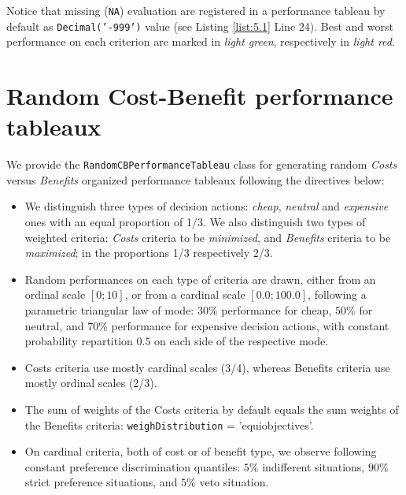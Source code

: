 Notice that missing (\texttt{NA}) evaluation are registered in a performance tableau by default as \texttt{Decimal('-999')} value (see Listing \ref{list:5.1} Line 24). Best and worst performance on each criterion are marked in \emph{light green}, respectively in \emph{light red}.
	    
\section{Random Cost-Benefit performance tableaux}
\label{sec:5.3}

We provide the \texttt{RandomCBPerformanceTableau} class for generating random \emph{Costs} versus \emph{Benefits} organized performance tableaux following the directives below:
\begin{itemize}
\item We distinguish three types of decision actions: \emph{cheap}, \emph{neutral} and \emph{expensive} ones with an equal proportion of 1/3. We also distinguish two types of weighted criteria: \emph{Costs} criteria to be \emph{minimized}, and \emph{Benefits} criteria to be \emph{maximized}; in the proportions 1/3 respectively 2/3. 
\item  Random performances on each type of criteria  are drawn, either from an ordinal scale $[0;10]$, or from a cardinal scale $[0.0;100.0]$, following a parametric triangular law of mode: $30\%$ performance for cheap, $50\%$ for neutral, and $70\%$ performance for expensive decision actions, with constant probability repartition $0.5$ on each side of the respective mode. 
\item Costs criteria use mostly cardinal scales (3/4), whereas Benefits criteria use mostly ordinal scales (2/3). 
\item  The sum of weights of the Costs criteria by default equals the sum weights of the Benefits criteria: \texttt{weighDistribution} = 'equiobjectives'. 
\item On cardinal criteria, both of cost or of benefit type, we observe following constant preference discrimination quantiles: $5\%$ indifferent situations, $90\%$ strict preference situations, and $5\%$ veto situation. 
\end{itemize}

